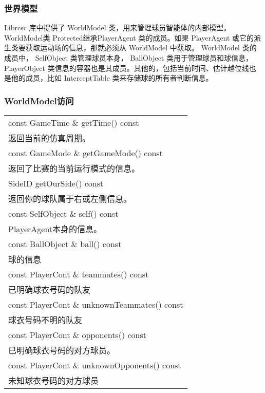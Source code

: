 \subsubsection{世界模型}
Librcsc 库中提供了 WorldModel 类，用来管理球员智能体的内部模型。 WorldModel类 Protected继承PlayerAgent 类的成员。如果 PlayerAgent 或它的派生类要获取运动场的信息，那就必须从 WorldModel 中获取。 WorldModel 类的成员中， SelfObject 类管理球员本身， BallObject 类用于管理球员和球信息，PlayerObject 类信息的容器也是其成员。其他的，包括当前时间、估计越位线也是他的成员，比如 InterceptTable 类来存储球的所有者判断信息。
\subsubsection{WorldModel访问}

	\begin{tabular}{p{}}
		\hline
		const GameTime \& getTime() const \\ 返回当前的仿真周期。\\
		\hline
		const GameMode \& getGameMode() const\\
		返回了比赛的当前运行模式的信息。\\
		\hline
		SideID getOurSide() const\\
		返回你的球队属于右或左侧信息。\\
		\hline
		const SelfObject \& self() const\\
		PlayerAgent本身的信息。\\
		\hline
		const BallObject \& ball() const\\
		球的信息\\
		\hline
		const PlayerCont \& teammates() const\\
		已明确球衣号码的队友\\
		\hline
		const PlayerCont \& unknownTeammates() const\\
		球衣号码不明的队友\\
		\hline
		const PlayerCont \& opponents() const\\
		已明确球衣号码的对方球员。\\
		\hline
		const PlayerCont \& unknownOpponents() const\\
		未知球衣号码的对方球员 \\
		\hline
	\end{tabular}

